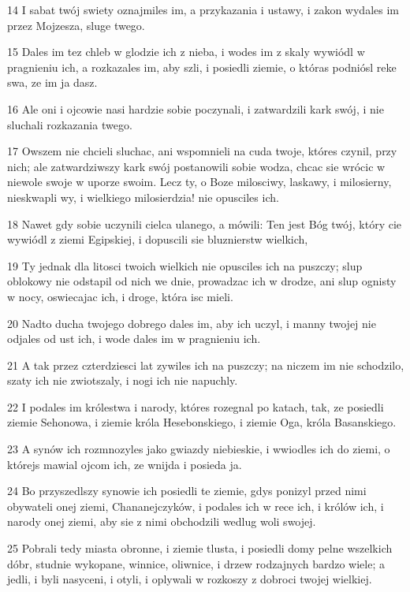 \par 14 I sabat twój swiety oznajmiles im, a przykazania i ustawy, i zakon wydales im przez Mojzesza, sluge twego.
\par 15 Dales im tez chleb w glodzie ich z nieba, i wodes im z skaly wywiódl w pragnieniu ich, a rozkazales im, aby szli, i posiedli ziemie, o któras podniósl reke swa, ze im ja dasz.
\par 16 Ale oni i ojcowie nasi hardzie sobie poczynali, i zatwardzili kark swój, i nie sluchali rozkazania twego.
\par 17 Owszem nie chcieli sluchac, ani wspomnieli na cuda twoje, któres czynil, przy nich; ale zatwardziwszy kark swój postanowili sobie wodza, chcac sie wrócic w niewole swoje w uporze swoim. Lecz ty, o Boze milosciwy, laskawy, i milosierny, nieskwapli wy, i wielkiego milosierdzia! nie opusciles ich.
\par 18 Nawet gdy sobie uczynili cielca ulanego, a mówili: Ten jest Bóg twój, który cie wywiódl z ziemi Egipskiej, i dopuscili sie bluznierstw wielkich,
\par 19 Ty jednak dla litosci twoich wielkich nie opusciles ich na puszczy; slup oblokowy nie odstapil od nich we dnie, prowadzac ich w drodze, ani slup ognisty w nocy, oswiecajac ich, i droge, która isc mieli.
\par 20 Nadto ducha twojego dobrego dales im, aby ich uczyl, i manny twojej nie odjales od ust ich, i wode dales im w pragnieniu ich.
\par 21 A tak przez czterdziesci lat zywiles ich na puszczy; na niczem im nie schodzilo, szaty ich nie zwiotszaly, i nogi ich nie napuchly.
\par 22 I podales im królestwa i narody, któres rozegnal po katach, tak, ze posiedli ziemie Sehonowa, i ziemie króla Hesebonskiego, i ziemie Oga, króla Basanskiego.
\par 23 A synów ich rozmnozyles jako gwiazdy niebieskie, i wwiodles ich do ziemi, o którejs mawial ojcom ich, ze wnijda i posieda ja.
\par 24 Bo przyszedlszy synowie ich posiedli te ziemie, gdys ponizyl przed nimi obywateli onej ziemi, Chananejczyków, i podales ich w rece ich, i królów ich, i narody onej ziemi, aby sie z nimi obchodzili wedlug woli swojej.
\par 25 Pobrali tedy miasta obronne, i ziemie tlusta, i posiedli domy pelne wszelkich dóbr, studnie wykopane, winnice, oliwnice, i drzew rodzajnych bardzo wiele; a jedli, i byli nasyceni, i otyli, i oplywali w rozkoszy z dobroci twojej wielkiej.
